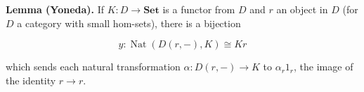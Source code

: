 \textbf{Lemma (Yoneda).} If $K: D \to \mathbf{Set}$ is a functor from $D$ and $r$ an object in $D$ (for $D$ a category with small hom-sets), there is a bijection

\[
y: \operatorname{Nat}(D(r, -), K) \cong Kr
\]

which sends each natural transformation $\alpha: D(r, -) \to K$ to $\alpha_r 1_r$, the image of the identity $r \to r$.
